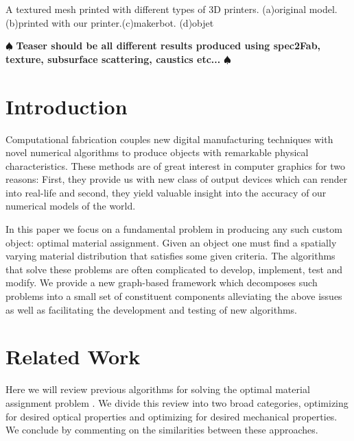 \documentclass[annual]{acmsiggraph}
\newcommand{\note}[1]{\marginpar{\LARGE $\spadesuit$}
			$\spadesuit$ {\bf #1} $\spadesuit$}
\begin{document}
{\begin{subfigure}[b]{0.18\textwidth}
                \caption{}
                \label{teaser:objet}
        \end{subfigure}
        \caption{A textured mesh printed with different types of 3D printers.
        	(a)original model.(b)printed with our printer.(c)makerbot.
        	(d)objet}\label{teaser}
	\label{fig:texture}
 }

\maketitle

\begin{abstract}


\end{abstract}

\keywordlist

\TOGlinkslist

\copyrightspace

\note{Teaser should be all different results produced using spec2Fab, texture, subsurface scattering, caustics etc...}


\section{Introduction}
Computational fabrication couples new digital manufacturing techniques with novel numerical algorithms to produce objects with remarkable physical characteristics. These methods are of great interest in computer graphics for two reasons: First, they provide us with  new class of output devices which can render into  real-life and second, they yield valuable insight into the accuracy of our numerical models of the world.  

In this paper we focus on a fundamental problem in producing any such custom object:  optimal material assignment. Given an object one must find a spatially varying material distribution that satisfies some given criteria. The algorithms that solve these problems are often complicated to develop, implement, test and modify. We provide a new graph-based framework which decomposes such problems into a small set of constituent components alleviating the above issues as well as facilitating the development and testing of new algorithms. 

\section{Related Work} 
Here we will review previous algorithms for solving the optimal material assignment problem . We divide this review into two broad categories, optimizing for desired optical properties and optimizing for desired mechanical properties. We conclude by commenting on the similarities between these approaches.
\end{document}
